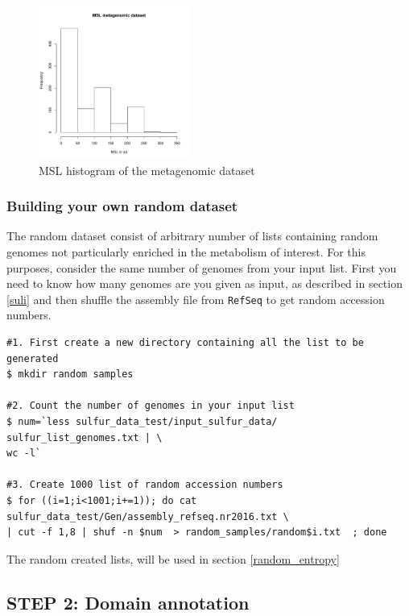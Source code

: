 \documentclass[12pt]{report}
\begin{document}
  \begin{figure}[H]
  \centering
    \includegraphics[width=50mm, scale=0.5]{hist.pdf}
    \caption{MSL histogram of the metagenomic dataset }
        \label{fig:msl_metagenomes}
\end{figure}


\subsubsection{Building your own random dataset}

\label{building_random}
The random dataset consist of arbitrary number of lists containing random genomes not particularly enriched in the metabolism of interest. For this purposes, consider the same number of genomes from your input list. First you need to know how many genomes are you given as input, as described in section \ref{suli} and then shuffle the assembly file from \texttt{RefSeq} to get random accession numbers.
\begin{verbatim}
#1. First create a new directory containing all the list to be generated 
$ mkdir random samples 

#2. Count the number of genomes in your input list 
$ num=`less sulfur_data_test/input_sulfur_data/  sulfur_list_genomes.txt | \
wc -l`

#3. Create 1000 list of random accession numbers  
$ for ((i=1;i<1001;i+=1)); do cat sulfur_data_test/Gen/assembly_refseq.nr2016.txt \
| cut -f 1,8 | shuf -n $num  > random_samples/random$i.txt  ; done
\end{verbatim}

The random created lists, will be used in section \ref{random_entropy}

\subsection{STEP 2: Domain annotation}
\label{step2}
\end{document}
